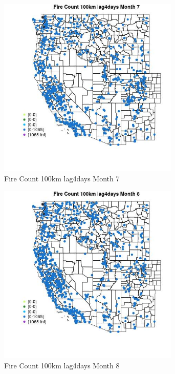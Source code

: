 \begin{figure} 
\centering  
\includegraphics[width=0.77\textwidth]{Code_Outputs/Report_ML_input_PM25_Step4_part_f_de_duplicated_aves_prioritize_24hr_obswNAs_MapObsMo7Fire_Count_100km_lag4days.jpg} 
\caption{\label{fig:Report_ML_input_PM25_Step4_part_f_de_duplicated_aves_prioritize_24hr_obswNAsMapObsMo7Fire_Count_100km_lag4days}Fire Count 100km lag4days Month 7} 
\end{figure} 
 

\begin{figure} 
\centering  
\includegraphics[width=0.77\textwidth]{Code_Outputs/Report_ML_input_PM25_Step4_part_f_de_duplicated_aves_prioritize_24hr_obswNAs_MapObsMo8Fire_Count_100km_lag4days.jpg} 
\caption{\label{fig:Report_ML_input_PM25_Step4_part_f_de_duplicated_aves_prioritize_24hr_obswNAsMapObsMo8Fire_Count_100km_lag4days}Fire Count 100km lag4days Month 8} 
\end{figure} 
 

